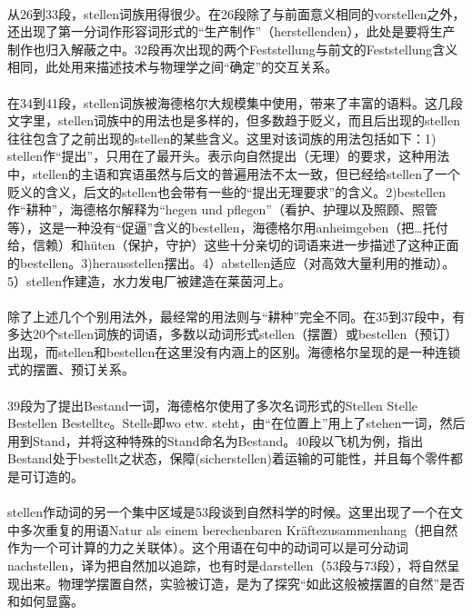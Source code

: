 \documentclass{article}
\begin{document}
			\paragraph{}
		从26到33段，stellen词族用得很少。在26段除了与前面意义相同的vorstellen之外，还出现了第一分词作形容词形式的“生产制作”（herstellenden），此处是要将生产制作也归入解蔽之中。32段再次出现的两个Feststellung与前文的Feststellung含义相同，此处用来描述技术与物理学之间“确定”的交互关系。
			\paragraph{}
		在34到41段，stellen词族被海德格尔大规模集中使用，带来了丰富的语料。这几段文字里，stellen词族中的用法也是多样的，但多数趋于贬义，而且后出现的stellen往往包含了之前出现的stellen的某些含义。这里对该词族的用法包括如下：1) stellen作“提出”，只用在了最开头。表示向自然提出（无理）的要求，这种用法中，stellen的主语和宾语虽然与后文的普遍用法不太一致，但已经给stellen了一个贬义的含义，后文的stellen也会带有一些的“提出无理要求”的含义。2)bestellen作“耕种”，海德格尔解释为“hegen und pflegen”（看护、护理以及照顾、照管等），这是一种没有“促逼”含义的bestellen，海德格尔用anheimgeben（把…托付给，信赖）和hüten（保护，守护）这些十分亲切的词语来进一步描述了这种正面的bestellen。3)herausstellen摆出。4）abstellen适应（对高效大量利用的推动）。5）stellen作建造，水力发电厂被建造在莱茵河上。
			\paragraph{}
		除了上述几个个别用法外，最经常的用法则与“耕种”完全不同。在35到37段中，有多达20个stellen词族的词语，多数以动词形式stellen（摆置）或bestellen（预订）出现，而stellen和bestellen在这里没有内涵上的区别。海德格尔呈现的是一种连锁式的摆置、预订关系。

			\paragraph{}
		39段为了提出Bestand一词，海德格尔使用了多次名词形式的Stellen Stelle Bestellen Bestellte。Stelle即wo etw. steht\cite{yellow_etym}，由“在位置上”用上了stehen一词，然后用到Stand，并将这种特殊的Stand命名为Bestand。40段以飞机为例，指出Bestand处于bestellt之状态，保障(sicherstellen)着运输的可能性，并且每个零件都是可订造的。
		
		
			\paragraph{}
		stellen作动词的另一个集中区域是53段谈到自然科学的时候。这里出现了一个在文中多次重复的用语Natur als einem berechenbaren Kräftezusammenhang（把自然作为一个可计算的力之关联体）。这个用语在句中的动词可以是可分动词nachstellen，译为把自然加以追踪，也有时是darstellen（53段与73段），将自然呈现出来。物理学摆置自然，实验被订造，是为了探究“如此这般被摆置的自然”是否和如何显露。
\end{document}
